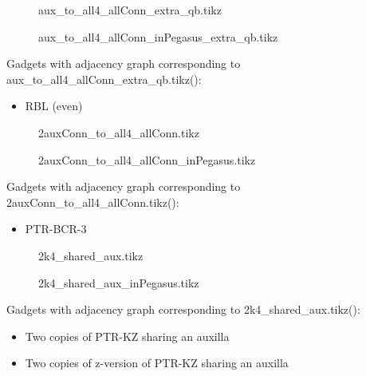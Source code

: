 \documentclass{article}
\begin{document}
\begin{figure}

\caption{aux\_to\_all4\_allConn\_extra\_qb.tikz}
\end{figure}

\begin{figure}

\caption{aux\_to\_all4\_allConn\_inPegasus\_extra\_qb.tikz}
\end{figure}



Gadgets with adjacency graph corresponding to aux\_to\_all4\_allConn\_extra\_qb.tikz(\scalebox{.25}{}):

\begin{itemize}
\item RBL (even)
\end{itemize}

\begin{figure}

\caption{2auxConn\_to\_all4\_allConn.tikz}
\end{figure}

\begin{figure}

\caption{2auxConn\_to\_all4\_allConn\_inPegasus.tikz}
\end{figure}

Gadgets with adjacency graph corresponding to 2auxConn\_to\_all4\_allConn.tikz(\scalebox{.25}{}):

\begin{itemize}
\item PTR-BCR-3
\end{itemize}

\begin{figure}

\caption{2k4\_shared\_aux.tikz}
\end{figure}

\begin{figure}

\caption{2k4\_shared\_aux\_inPegasus.tikz}
\end{figure}

Gadgets with adjacency graph corresponding to 2k4\_shared\_aux.tikz(\scalebox{.25}{}):

\begin{itemize}
\item Two copies of PTR-KZ sharing an auxilla
\item Two copies of z-version of PTR-KZ sharing an auxilla
\end{itemize}
\end{document}
